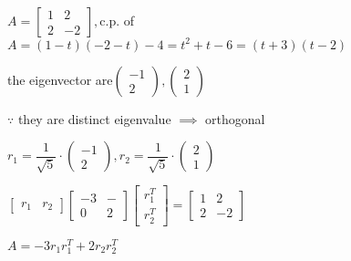 \begin{tcolorbox}
	$A = \left[\begin{matrix}
		1&2\\2&-2
	\end{matrix}\right],$c.p. of $A = (1-t)(-2-t)-4 = t^2+t-6 = (t+3)(t-2)$
	
	the eigenvector are$\left(\begin{matrix}
		-1\\2
	\end{matrix}\right), \left( \begin{matrix}
		2\\1
	\end{matrix}\right)$
	
	$\because$ they are distinct eigenvalue $\implies $ orthogonal 
	
	$r_1 = \dfrac{1}{\sqrt{5}}\cdot \left(\begin{matrix}
		-1\\2
	\end{matrix}\right),r_2 = \dfrac{1}{\sqrt{5}}\cdot \left(\begin{matrix}
		2\\1
	\end{matrix}\right)$
	
	$\left[\begin{matrix}
		r_1&r_2
	\end{matrix}\right]\left[\begin{matrix}
		-3&-\\0&2
	\end{matrix}\right]\left[\begin{matrix}
		r_1^{T}\\r_2^{T}
	\end{matrix}\right] = \left[\begin{matrix}
		1&2\\2&-2
	\end{matrix}\right]$
	
	$A = -3r_1r_1^{T} + 2 r_2r_2^{T}$
	
\end{tcolorbox}





























